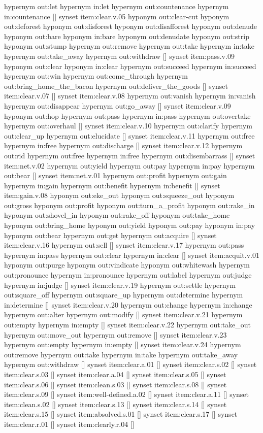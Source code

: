 \begin{draft}
hypernym out:let
hypernym in:let
hypernym out:countenance
hypernym in:countenance
[]
synset item:clear.v.05
hyponym out:clear-cut
hyponym out:deforest
hyponym out:disforest
hyponym out:disafforest
hyponym out:denude
hyponym out:bare
hyponym in:bare
hyponym out:denudate
hyponym out:strip
hyponym out:stump
hypernym out:remove
hypernym out:take
hypernym in:take
hypernym out:take\_away
hypernym out:withdraw
[]
synset item:pass.v.09
hyponym out:clear
hyponym in:clear
hypernym out:succeed
hypernym in:succeed
hypernym out:win
hypernym out:come\_through
hypernym out:bring\_home\_the\_bacon
hypernym out:deliver\_the\_goods
[]
synset item:clear.v.07
[]
synset item:clear.v.08
hypernym out:vanish
hypernym in:vanish
hypernym out:disappear
hypernym out:go\_away
[]
synset item:clear.v.09
hyponym out:hop
hypernym out:pass
hypernym in:pass
hypernym out:overtake
hypernym out:overhaul
[]
synset item:clear.v.10
hypernym out:clarify
hypernym out:clear\_up
hypernym out:elucidate
[]
synset item:clear.v.11
hypernym out:free
hypernym in:free
hypernym out:discharge
[]
synset item:clear.v.12
hypernym out:rid
hypernym out:free
hypernym in:free
hypernym out:disembarrass
[]
synset item:net.v.02
hypernym out:yield
hypernym out:pay
hypernym in:pay
hypernym out:bear
[]
synset item:net.v.01
hypernym out:profit
hypernym out:gain
hypernym in:gain
hypernym out:benefit
hypernym in:benefit
[]
synset item:gain.v.08
hyponym out:eke\_out
hyponym out:squeeze\_out
hyponym out:gross
hyponym out:profit
hyponym out:turn\_a\_profit
hyponym out:rake\_in
hyponym out:shovel\_in
hyponym out:rake\_off
hyponym out:take\_home
hyponym out:bring\_home
hyponym out:yield
hyponym out:pay
hyponym in:pay
hyponym out:bear
hypernym out:get
hypernym out:acquire
[]
synset item:clear.v.16
hypernym out:sell
[]
synset item:clear.v.17
hypernym out:pass
hypernym in:pass
hypernym out:clear
hypernym in:clear
[]
synset item:acquit.v.01
hyponym out:purge
hyponym out:vindicate
hyponym out:whitewash
hypernym out:pronounce
hypernym in:pronounce
hypernym out:label
hypernym out:judge
hypernym in:judge
[]
synset item:clear.v.19
hypernym out:settle
hypernym out:square\_off
hypernym out:square\_up
hypernym out:determine
hypernym in:determine
[]
synset item:clear.v.20
hypernym out:change
hypernym in:change
hypernym out:alter
hypernym out:modify
[]
synset item:clear.v.21
hypernym out:empty
hypernym in:empty
[]
synset item:clear.v.22
hypernym out:take\_out
hypernym out:move\_out
hypernym out:remove
[]
synset item:clear.v.23
hypernym out:empty
hypernym in:empty
[]
synset item:clear.v.24
hypernym out:remove
hypernym out:take
hypernym in:take
hypernym out:take\_away
hypernym out:withdraw
[]
synset item:clear.a.01
[]
synset item:clear.s.02
[]
synset item:clear.s.03
[]
synset item:clear.a.04
[]
synset item:clear.s.05
[]
synset item:clear.s.06
[]
synset item:clean.s.03
[]
synset item:clear.s.08
[]
synset item:clear.s.09
[]
synset item:well-defined.a.02
[]
synset item:clear.a.11
[]
synset item:clean.s.02
[]
synset item:clear.s.13
[]
synset item:clear.s.14
[]
synset item:clear.s.15
[]
synset item:absolved.s.01
[]
synset item:clear.s.17
[]
synset item:clear.r.01
[]
synset item:clearly.r.04
[]
\end{draft}


